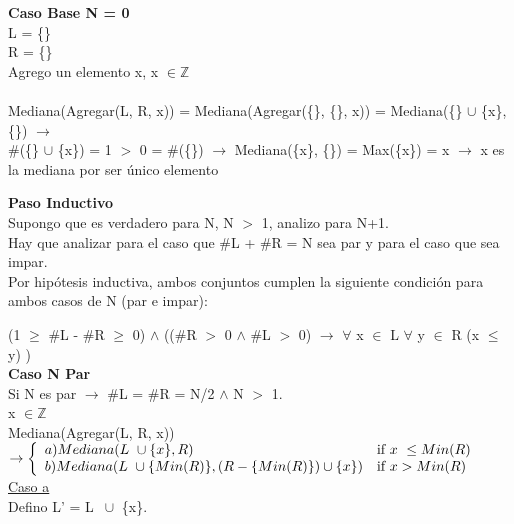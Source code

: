 \documentclass{article}
\theoremstyle{definition}
\theoremstyle{remark}
\begin{document}
\textbf{Caso Base N = 0} \\

L = \{\} \\  

R = \{\} \\ 

Agrego un elemento x, x $\in \mathds{Z}$ \\ \\

Mediana(Agregar(L, R, x)) = 
Mediana(Agregar(\{\}, \{\}, x)) =
Mediana(\{\} $\cup$ \{x\}, \{\}) $\rightarrow$ \\ 
\#(\{\} $\cup$ \{x\}) = 1 $>$ 0 = \#(\{\}) $\rightarrow$
Mediana(\{x\}, \{\}) = Max(\{x\}) = x $\rightarrow$ x es la mediana por ser único elemento

\textbf{Paso Inductivo} \\

Supongo que es verdadero para N, N $>$ 1, analizo para N+1.\\

Hay que analizar para el caso que \#L + \#R = N sea par y para el caso que sea impar. \\

Por hipótesis inductiva, ambos conjuntos cumplen la siguiente condición para ambos casos de N (par e impar): 

(1 $\geq$ \#L - \#R $\geq$ 0) $\wedge$ ((\#R $>$ 0 $\wedge$ \#L $>$ 0) $\rightarrow$ $\forall$ x $\in$ L $\forall$ y $\in$ R (x $\leq$ y) ) \\

\textbf{Caso N Par}\\ 

Si N es par $\rightarrow$ \#L = \#R = N/2 $\wedge$ N $>$ 1.\\ 

x $\in \mathds{Z}$ \\

Mediana(Agregar(L, R, x)) $\rightarrow \twopartdef{ a) Mediana(L \ \cup \{x\}, R)}
                                                        {x \ \leq Min(R)}
                                                    {b) Mediana(L  \ \cup \{Min(R)\}, (R - \{Min(R)\}) \cup \{x\})}
                                                        {x > Min(R)}$\\
                                                        
\underline{Caso a}\\

Defino L' = L $\ \cup$ \{x\}.\\
\end{document}
